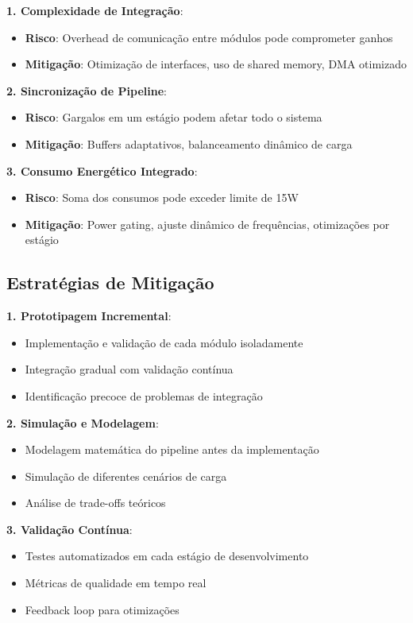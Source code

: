 \textbf{1. Complexidade de Integração}:
\begin{itemize}
    \item \textbf{Risco}: Overhead de comunicação entre módulos pode comprometer ganhos
    \item \textbf{Mitigação}: Otimização de interfaces, uso de shared memory, DMA otimizado
\end{itemize}

\textbf{2. Sincronização de Pipeline}:
\begin{itemize}
    \item \textbf{Risco}: Gargalos em um estágio podem afetar todo o sistema
    \item \textbf{Mitigação}: Buffers adaptativos, balanceamento dinâmico de carga
\end{itemize}

\textbf{3. Consumo Energético Integrado}:
\begin{itemize}
    \item \textbf{Risco}: Soma dos consumos pode exceder limite de 15W
    \item \textbf{Mitigação}: Power gating, ajuste dinâmico de frequências, otimizações por estágio
\end{itemize}

\subsection{Estratégias de Mitigação}\label{subsec:estrategias_mitigacao}

\textbf{1. Prototipagem Incremental}:
\begin{itemize}
    \item Implementação e validação de cada módulo isoladamente
    \item Integração gradual com validação contínua
    \item Identificação precoce de problemas de integração
\end{itemize}

\textbf{2. Simulação e Modelagem}:
\begin{itemize}
    \item Modelagem matemática do pipeline antes da implementação
    \item Simulação de diferentes cenários de carga
    \item Análise de trade-offs teóricos
\end{itemize}

\textbf{3. Validação Contínua}:
\begin{itemize}
    \item Testes automatizados em cada estágio de desenvolvimento
    \item Métricas de qualidade em tempo real
    \item Feedback loop para otimizações
\end{itemize}

